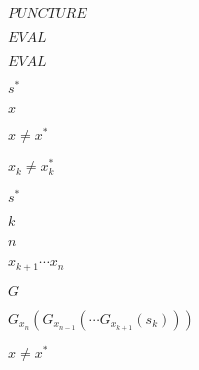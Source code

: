 \documentclass[10pt]{book}
\begin{document}
\begin{mdSnippets}
\begin{mdInlineSnippet}[0ae38247a0db2f3b37545a2237f9ddb7]
$PUNCTURE$\end{mdInlineSnippet}%
\begin{mdInlineSnippet}[1f8cb46fe06733d6f0dd650117e6ab66]%
$EVAL$\end{mdInlineSnippet}%
\begin{mdInlineSnippet}[1f8cb46fe06733d6f0dd650117e6ab66]%
$EVAL$\end{mdInlineSnippet}%
\begin{mdInlineSnippet}[a4f30b4084dd8599723853c370c75cc9]%
$s^*$\end{mdInlineSnippet}%
\begin{mdInlineSnippet}[9dd4e461268c8034f5c8564e155c67a6]%
$x$\end{mdInlineSnippet}%
\begin{mdInlineSnippet}[c9233e03983076893b8ac6591e0638d1]%
$x \neq x^*$\end{mdInlineSnippet}%
\begin{mdInlineSnippet}[91d5297fa3c7debfef111890800ba071]%
$x_k \neq x_k^*$\end{mdInlineSnippet}%
\begin{mdInlineSnippet}[a4f30b4084dd8599723853c370c75cc9]%
$s^*$\end{mdInlineSnippet}%
\begin{mdInlineSnippet}[8ce4b16b22b58894aa86c421e8759df3]%
$k$\end{mdInlineSnippet}%
\begin{mdInlineSnippet}[7b8b965ad4bca0e41ab51de7b31363a1]%
$n$\end{mdInlineSnippet}%
\begin{mdInlineSnippet}[0d3415a8d56460af228c56155a955250]%
$x_{k+1}\cdots x_{n}$\end{mdInlineSnippet}%
\begin{mdInlineSnippet}[dfcf28d0734569a6a693bc8194de62bf]%
$G$\end{mdInlineSnippet}%
\begin{mdInlineSnippet}%
$G_{x_n}(G_{x_{n-1}}(\cdots G_{x_{k+1}}(s_k)))$\end{mdInlineSnippet}%
\begin{mdInlineSnippet}[c9233e03983076893b8ac6591e0638d1]%
$x \neq x^*$\end{mdInlineSnippet}%

\end{mdSnippets}
\end{document}
